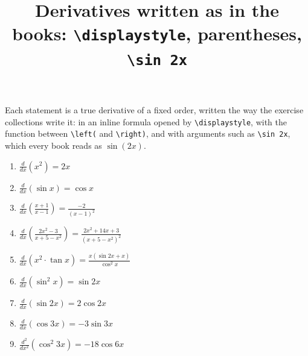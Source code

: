 \documentclass[11pt,a4paper]{article}
\title{Derivatives written as in the books: \texttt{\textbackslash displaystyle}, parentheses, \texttt{\textbackslash sin 2x}}
\author{}
\date{}
\begin{document}
\maketitle
Each statement is a true derivative of a fixed order, written the way the exercise collections write it: in an inline formula opened by \verb|\displaystyle|, with the function between \verb|\left(| and \verb|\right)|, and with arguments such as \verb|\sin 2x|, which every book reads as $\sin(2x)$.

\begin{enumerate}
\item $\displaystyle \frac{d}{dx}\left( x^{2} \right) = 2x$
\item $\displaystyle \frac{d}{dx}\left( \sin x \right) = \cos x$
\item $\displaystyle \frac{d}{dx}\left( \frac{x + 1}{x - 1} \right) = \frac{-2}{(x - 1)^{2}}$
\item $\displaystyle \frac{d}{dx}\left( \frac{2x^{2} - 3}{x + 5 - x^{2}} \right) = \frac{2x^{2} + 14x + 3}{(x + 5 - x^{2})^{2}}$
\item $\displaystyle \frac{d}{dx}\left( x^{2} \cdot \tan x \right) = \frac{x(\sin 2x + x)}{\cos^{2} x}$
\item $\displaystyle \frac{d}{dx}\left( \sin^{2} x \right) = \sin 2x$
\item $\displaystyle \frac{d}{dx}\left( \sin 2x \right) = 2\cos 2x$
\item $\textstyle \frac{d}{dx}\left( \cos 3x \right) = -3\sin 3x$
\item $\displaystyle \frac{d^{2}}{dx^{2}}\left( \cos^{2} 3x \right) = -18\cos 6x$
\end{enumerate}
\end{document}
